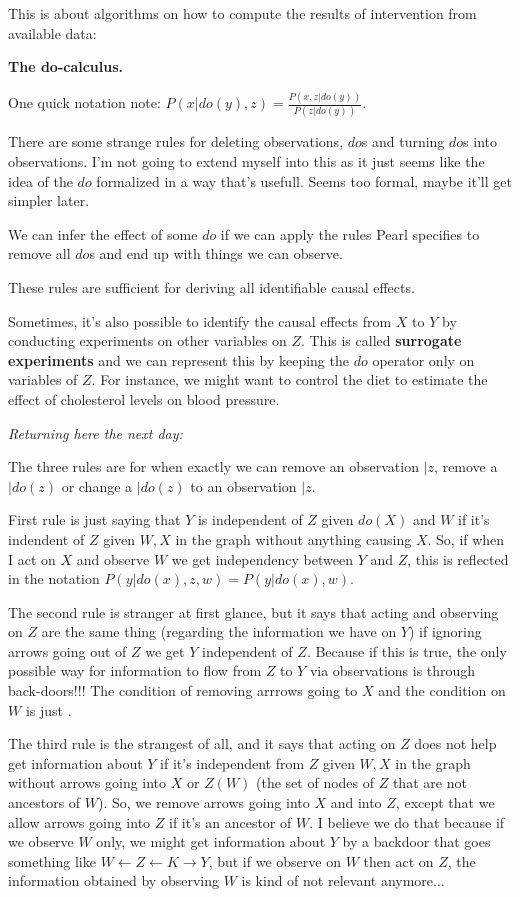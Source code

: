This is about algorithms on how to compute the results of intervention from available data:

\textbf{The do-calculus.}

One quick notation note: $P(x|do(y),z) = \frac{P(x,z|do(y))}{P(z|do(y))}$.

There are some strange rules for deleting observations, $do$s and turning $do$s into observations. I'm not going to extend myself into this as it just seems like the idea of the $do$ formalized in a way that's usefull. Seems too formal, maybe it'll get simpler later.

We can infer the effect of some $do$ if we can apply the rules Pearl specifies to remove all $do$s and end up with things we can observe.

These rules are sufficient for deriving all identifiable causal effects.

Sometimes, it's also possible to identify the causal effects from $X$ to $Y$ by conducting experiments on other variables on $Z$. This is called \textbf{surrogate experiments} and we can represent this by keeping the $do$ operator only on variables of $Z$. For instance, we might want to control the diet to estimate the effect of cholesterol levels on blood pressure.


\textit{Returning here the next day:}

The three rules are for when exactly we can remove an observation $|z$, remove a $|do(z)$ or change a $|do(z)$ to an observation $|z$.

First rule is just saying that $Y$ is independent of $Z$ given $do(X)$ and $W$ if it's indendent of $Z$ given $W,X$ in the graph without anything causing $X$. So, if when I act on $X$ and observe $W$ we get independency between $Y$ and $Z$, this is reflected in the notation $P(y|do(x),z,w) = P(y|do(x),w)$.

The second rule is stranger at first glance, but it says that acting and observing on $Z$ are the same thing (regarding the information we have on $Y$) if ignoring arrows going out of $Z$ we get $Y$ independent of $Z$. Because if this is true, the only possible way for information to flow from $Z$ to $Y$ via observations is through back-doors!!! The condition of removing arrrows going to $X$ and the condition on $W$ is just .

The third rule is the strangest of all, and it says that acting on $Z$ does not help get information about $Y$ if it's independent from $Z$ given $W,X$ in the graph without arrows going into $X$ or $Z(W)$ (the set of nodes of $Z$ that are not ancestors of $W$). So, we remove arrows going into $X$ and into $Z$, except that we allow arrows going into $Z$ if it's an ancestor of $W$. I believe we do that because if we observe $W$ only, we might get information about $Y$ by a backdoor that goes something like $W \leftarrow Z\leftarrow K\rightarrow Y$, but if we observe on $W$ then act on $Z$, the information obtained by observing $W$ is kind of not relevant anymore...

